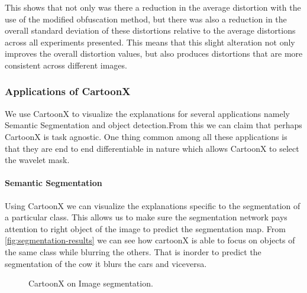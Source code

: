This shows that not only was there a reduction in the average distortion with the use of the modified obfuscation method, but there was also a reduction in the overall standard deviation of these distortions relative to the average distortions across all experiments presented. This means that this slight alteration not only improves the overall distortion values, but also produces distortions that are more consistent across different images.

\subsubsection{Applications of  CartoonX}
We use CartoonX to visualize the explanations for several applications namely Semantic Segmentation and object detection.From this we can claim that perhaps CartoonX is task agnostic. One thing common among all these applications is that they are end to end differentiable in nature which allows CartoonX to select the wavelet mask.
\paragraph{Semantic Segmentation}
Using CartoonX we can visualize the explanations specific to the segmentation of a particular class. This allows us to make sure the segmentation network pays attention to right object of the image to predict the segmentation map. From \autoref{fig:segmentation-results} we can see how cartoonX is able to focus on objects of the same class while blurring the others. That is inorder to predict the segmentation of the cow it blurs the cars and viceversa.

\begin{figure}[ht]

\centering
{}\hfil
{}\hfil 
{} 

\hfil   
{}\hfil
{}
\caption{CartoonX on Image segmentation.}\label{fig:segmentation-results}
\end{figure}






